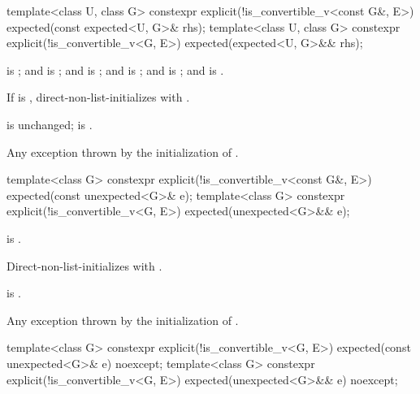 %
\begin{itemdecl}
template<class U, class G>
  constexpr explicit(!is_convertible_v<const G&, E>) expected(const expected<U, G>& rhs);
template<class U, class G>
  constexpr explicit(!is_convertible_v<G, E>) expected(expected<U, G>&& rhs);
\end{itemdecl}

\begin{itemdescr}
\pnum
\constraints
{} is ; and  is ; and  is ; and  is ; and  is ; and  is .

\pnum
\effects
If  is , direct-non-list-initializes  with .

\pnum
\ensures
{} is unchanged;  is .

\pnum
\throws
Any exception thrown by the initialization of .
\end{itemdescr}

%
\begin{itemdecl}
template<class G>
  constexpr explicit(!is_convertible_v<const G&, E>) expected(const unexpected<G>& e);
template<class G>
  constexpr explicit(!is_convertible_v<G, E>) expected(unexpected<G>&& e);
\end{itemdecl}

\begin{itemdescr}
\pnum
\constraints
{} is .

\pnum
\effects
Direct-non-list-initializes  with .

\pnum
\ensures
{} is .

\pnum
\throws
Any exception thrown by the initialization of .
\end{itemdescr}

%
\begin{itemdecl}
template<class G>
  constexpr explicit(!is_convertible_v<G, E>) expected(const unexpected<G>& e) noexcept;
template<class G>
  constexpr explicit(!is_convertible_v<G, E>) expected(unexpected<G>&& e) noexcept;
\end{itemdecl}

